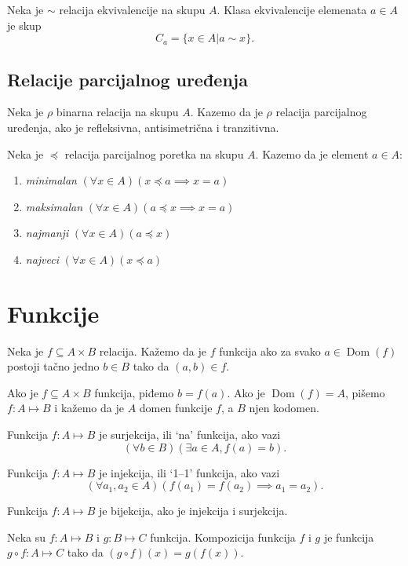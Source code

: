 \documentclass[12p,14paper]{article}
\DeclareMathOperator{\Dom}{Dom}
\begin{document}
\begin{multicols}{2}
    Neka je $\sim$ relacija ekvivalencije na skupu $A$. Klasa ekvivalencije 
    elemenata $a \in A$ je skup
    \[C_a = \{x \in A | a \sim x\}.\]

\subsection{Relacije parcijalnog uređenja}

    Neka je $\rho$ binarna relacija na skupu $A$. Kazemo da je $\rho$ relacija
    parcijalnog uređenja, ako je refleksivna, antisimetrična i tranzitivna.

    Neka je $\preceq$ relacija parcijalnog poretka na skupu $A$. Kazemo da je 
    element $a \in A$:
    \begin{enumerate}[]
        \itemsep0em
        \item \textit{minimalan} 
            $(\forall x \in A)(x \preceq a \implies x = a)$
        \item \textit{maksimalan} 
            $(\forall x \in A)(a \preceq x \implies x = a)$ 
        \item \textit{najmanji} 
            $(\forall x \in A)(a \preceq x)$
        \item \textit{najveci} 
            $(\forall x \in A)(x \preceq a)$
    \end{enumerate}

\section{Funkcije}

    Neka je $f \subseteq A \times B$ relacija. Kažemo da je $f$ funkcija ako 
    za svako $a \in \Dom (f)$ postoji tačno jedno $b \in B$ tako da 
    $(a,b) \in f$.

    Ako je $f \subseteq A \times B$ funkcija, piđemo $b = f(a)$. Ako je 
    $\Dom (f) = A$, pišemo $f: A \mapsto B$ i kažemo da je $A$ domen 
    funkcije $f$, a $B$ njen kodomen.

    Funkcija $f : A \mapsto B$ je surjekcija, ili `na' funkcija, ako vazi
    \[(\forall b \in B)(\exists a \in A, f(a) = b).\]

    Funkcija $f : A \mapsto B$ je injekcija, ili `1--1' funkcija, ako vazi
    \[(\forall a_1, a_2 \in A)(f(a_1) = f(a_2) \implies a_1 = a_2).\]

    Funkcija $f : A \mapsto B$ je bijekcija, ako je injekcija i surjekcija.

    Neka su $f: A \mapsto B$ i $g : B \mapsto C$ funkcija. Kompozicija funkcija
    $f$ i $g$ je funkcija $g \circ f : A \mapsto C$ tako da 
    $(g \circ f) (x) = g(f(x))$.


\end{multicols}
\end{document}
